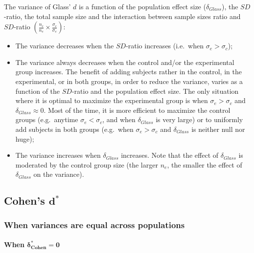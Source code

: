 \documentclass[
  english,
  man,mask]{apa6}
\providecommand{\tightlist}{%
  \setlength{\itemsep}{0pt}\setlength{\parskip}{0pt}}
\let\oldparagraph\paragraph
\renewcommand{\paragraph}[1]{\oldparagraph{#1}\mbox{}}
\begin{document}
The variance of Glass' \(d\) is a function of the population effect size (\(\delta_{Glass}\)), the \(SD\)-ratio, the total sample size and the interaction between sample sizes ratio and \(SD\)-ratio \(\left(\frac{n_c}{n_e}\times\frac{\sigma_c}{\sigma_e} \right)\):

\begin{itemize}
\tightlist
\item
  The variance decreases when the \(SD\)-ratio increases (i.e.~when \(\sigma_e > \sigma_c\));\\
\item
  The variance always decreases when the control and/or the experimental group increases. The benefit of adding subjects rather in the control, in the experimental, or in both groups, in order to reduce the variance, varies as a function of the \(SD\)-ratio and the population effect size. The only situation where it is optimal to maximize the experimental group is when \(\sigma_e > \sigma_c\) and \(\delta_{Glass} \approx 0\). Most of the time, it is more efficient to maximize the control groups (e.g.~anytime \(\sigma_e < \sigma_c\), and when \(\delta_{Glass}\) is very large) or to uniformly add subjects in both groups (e.g.~when \(\sigma_e > \sigma_c\) and \(\delta_{Glass}\) is neither null nor huge);
\item
  The variance increases when \(\delta_{Glass}\) increases. Note that the effect of \(\delta_{Glass}\) is moderated by the control group size (the larger \(n_e\), the smaller the effect of \(\delta_{Glass}\) on the variance).
\end{itemize}

\hypertarget{cohens-bmd-1}{%
\subsection{\texorpdfstring{Cohen's \(\bm{d^*}\)}{Cohen's \textbackslash bm\{d\^{}*\}}}\label{cohens-bmd-1}}

\hypertarget{when-variances-are-equal-across-populations-2}{%
\subsubsection{When variances are equal across populations}\label{when-variances-are-equal-across-populations-2}}

\hypertarget{when-bmdelta_cohen-0}{%
\paragraph{\texorpdfstring{When \(\bm{\delta^*_{Cohen} = 0}\)}{When \textbackslash bm\{\textbackslash delta\^{}*\_\{Cohen\} = 0\}}}\label{when-bmdelta_cohen-0}}
\end{document}
